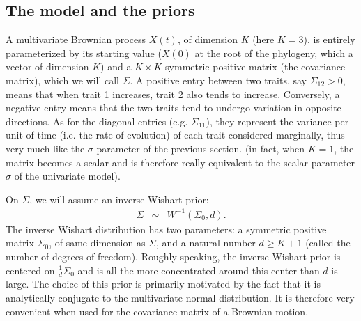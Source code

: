 \documentclass[usletter]{article}
\begin{document}
\subsection*{The model and the priors}

A multivariate Brownian process $X(t)$, of dimension $K$ (here $K=3$),
is entirely parameterized by its starting value ($X(0)$ at the root of the phylogeny, which a vector of dimension $K$) and a $K \times K$ symmetric positive matrix (the covariance matrix), which we will call $\Sigma$.
A positive entry between two traits, say $\Sigma_{12} > 0$, means that when trait 1 increases, trait 2 also tends to increase. Conversely, a negative entry means that the two traits tend to undergo variation in opposite directions.
As for the diagonal entries (e.g. $\Sigma_{11}$), they represent the variance per unit of time (i.e. the rate of evolution) of each trait considered marginally,
thus very much like the $\sigma$ parameter of the previous section.
(in fact, when $K=1$, the matrix becomes a scalar and is therefore really equivalent to the scalar parameter $\sigma$ of the univariate model).

On $\Sigma$, we will assume an inverse-Wishart prior:
\begin{eqnarray*}
\Sigma &\sim& W^{-1}(\Sigma_0, d).
\end{eqnarray*}
The inverse Wishart distribution has two parameters: a symmetric positive matrix $\Sigma_0$, of same dimension as $\Sigma$, and a natural number $d \ge K+1$ (called the number of degrees of freedom). Roughly speaking, the inverse Wishart prior is centered on $\frac{1}{d} \Sigma_0$ and is all the more concentrated around this center than $d$ is large.
The choice of this prior is primarily motivated by the fact that it is analytically conjugate to the multivariate normal distribution. It is therefore very convenient when used for the covariance matrix of a Brownian motion.
\end{document}
